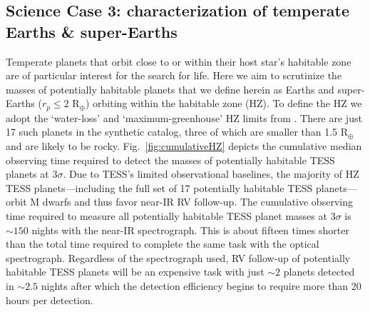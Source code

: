 \subsection{Science Case 3: characterization of temperate Earths \& super-Earths}
Temperate planets that orbit close to or within their host star's habitable zone are of particular
interest for the search for life.
Here we aim to scrutinize the masses of potentially habitable planets that we define herein as
Earths and super-Earths ($r_p \leq 2$ R$_{\oplus}$) orbiting within the habitable zone (HZ). To define
the HZ we adopt
the `water-loss' and `maximum-greenhouse' HZ limits from \cite{kopparapu13}. There are just 17 such
planets in the  synthetic catalog, three of which are smaller than 1.5
R$_{\oplus}$ and are likely to be rocky. 
Fig.~\ref{fig:cumulativeHZ} depicts the cumulative median observing time required to detect the masses
of potentially habitable TESS planets at $3\sigma$.
Due to TESS's limited observational baselines, the majority of HZ TESS
planets---including the full set of 17 potentially habitable TESS planets---orbit M dwarfs and thus
favor near-IR RV follow-up. The cumulative observing time required to measure all potentially
habitable TESS planet masses at $3\sigma$ is $\sim 150$ nights with
the near-IR spectrograph. This is about fifteen times shorter than the total time required
to complete the same task with the optical spectrograph. Regardless of the spectrograph
used, RV follow-up of potentially habitable TESS planets will be an expensive task with
just $\sim 2$ planets detected in $\sim 2.5$ nights after which the detection
efficiency begins to require more than 20 hours per detection.

